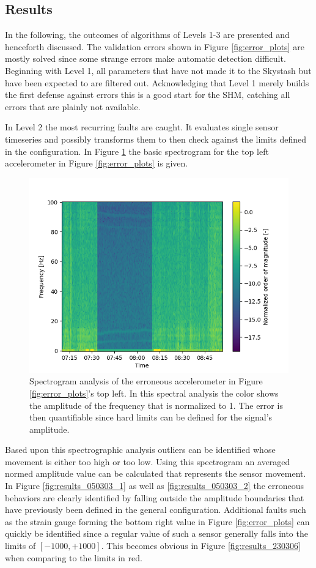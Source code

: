 \subsection{Results}


In the following, the outcomes of algorithms of Levels 1-3 are presented and henceforth discussed.
The validation errors shown in Figure \ref{fig:error_plots} are mostly solved since some strange errors make automatic detection difficult.
Beginning with Level 1, all  parameters that have not made it to the Skystash but have been expected to are filtered out. Acknowledging that Level 1 merely builds the first defense against errors this is a good start for the SHM, catching all errors that are plainly not available.

In Level 2 the most recurring faults are caught. It evaluates single sensor timeseries and possibly transforms them to then check against the limits defined in the configuration. In Figure \ref{fig:results_050303_spectrogram} the basic spectrogram for the top left accelerometer in Figure \ref{fig:error_plots} is given.

\begin{figure}
    \centering
    \includegraphics[width=.7\textwidth]{03_figures/python_functions/images/FUS_050303_spectro.png}
    \caption[Level 2 spectral analysis of an erroneous accelerometer]{Spectrogram analysis of the erroneous accelerometer in Figure \ref{fig:error_plots}'s top left. In this spectral analysis the color shows the amplitude of the frequency that is normalized to 1. The error is then quantifiable since hard limits can be defined for the signal's amplitude.}
    \label{fig:results_050303_spectrogram}
\end{figure}

Based upon this spectrographic analysis outliers can be identified whose movement is either too high or too low. Using this spectrogram an averaged normed amplitude value can be calculated that represents the sensor movement. In Figure \ref{fig:results_050303_1} as well as \ref{fig:results_050303_2} the erroneous behaviors are clearly identified by falling outside the amplitude boundaries that have previously been defined in the general configuration.
Additional faults such as the strain gauge forming the bottom right value in Figure \ref{fig:error_plots} can quickly be identified since a regular value of such a sensor generally falls into the limits of $[-1000, +1000]$. This becomes obvious in Figure \ref{fig:results_230306} when comparing to the limits in red.


